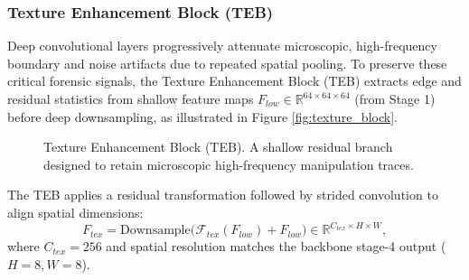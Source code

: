 \subsubsection{Texture Enhancement Block (TEB)}
Deep convolutional layers progressively attenuate microscopic, high-frequency boundary and noise artifacts due to repeated spatial pooling. To preserve these critical forensic signals, the Texture Enhancement Block (TEB) extracts edge and residual statistics from shallow feature maps $F_{low} \in \mathbb{R}^{64 \times 64 \times 64}$ (from Stage 1) before deep downsampling, as illustrated in Figure \ref{fig:texture_block}.

\begin{figure}[ht]
    \centering
    \caption{Texture Enhancement Block (TEB). A shallow residual branch designed to retain microscopic high-frequency manipulation traces.}
    \label{fig:texture_block}
    \label{fig:teb}
\end{figure}

The TEB applies a residual transformation followed by strided convolution to align spatial dimensions:
\begin{equation}
    F_{tex} = \text{Downsample}\Big(\mathcal{F}_{tex}(F_{low}) + F_{low}\Big) \in \mathbb{R}^{C_{tex} \times H \times W},
\end{equation}
where $C_{tex} = 256$ and spatial resolution matches the backbone stage-4 output ($H=8, W=8$).

